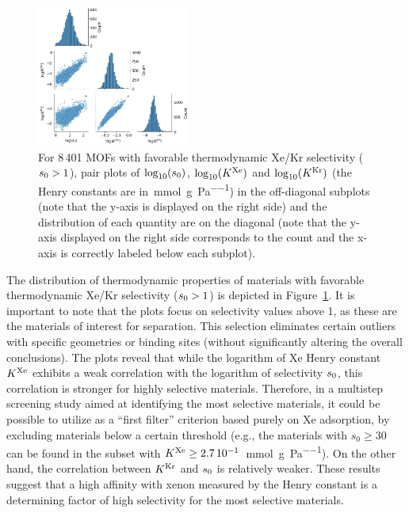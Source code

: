 \documentclass[main.tex]{subfiles}
\begin{document}
\begin{figure}[h]
  \centering
    \includegraphics[width=0.45\textwidth]{figures/2-thermo/Henry_0.jpg}
    \caption{For 8\,401 MOFs with favorable thermodynamic Xe/Kr selectivity ($s_{\text{0}} > 1$), pair plots of $\log_{\text{10}}(s_{\text{0}})$, $\log_{\text{10}}(K^{\text{Xe}})$ and $\log_{\text{10}}(K^{\text{Kr}})$ (the Henry constants are in~\si{\milli\mol\per\gram\per\pascal}) in the off-diagonal subplots (note that the y-axis is displayed on the right side) and the distribution of each quantity are on the diagonal (note that the y-axis displayed on the right side corresponds to the count and the x-axis is correctly labeled below each subplot).}\label{fgr:histo_K}
  \end{figure}
  
The distribution of thermodynamic properties of materials with favorable thermodynamic Xe/Kr selectivity ($s_{\text{0}} > 1$) is depicted in Figure~\ref{fgr:histo_K}. It is important to note that the plots focus on selectivity values above 1, as these are the materials of interest for separation. This selection eliminates certain outliers with specific geometries or binding sites (without significantly altering the overall conclusions). The plots reveal that while the logarithm of Xe Henry constant $K^{\text{Xe}}$ exhibits a weak correlation with the logarithm of selectivity $s_{\text{0}}$, this correlation is stronger for highly selective materials. Therefore, in a multistep screening study aimed at identifying the most selective materials, it could be possible to utilize as a ``first filter'' criterion based purely on Xe adsorption, by excluding materials below a certain threshold (e.g., the materials with $s_0\ge30$ can be found in the subset with $K^{\text{Xe}}\ge2.7\,10^{-1}$~\si{\milli\mol\per\gram\per\pascal}). On the other hand, the correlation between $K^{\text{Kr}}$ and $s_{\text{0}}$ is relatively weaker. These results suggest that a high affinity with xenon measured by the Henry constant is a determining factor of high selectivity for the most selective materials.  
\end{document}
